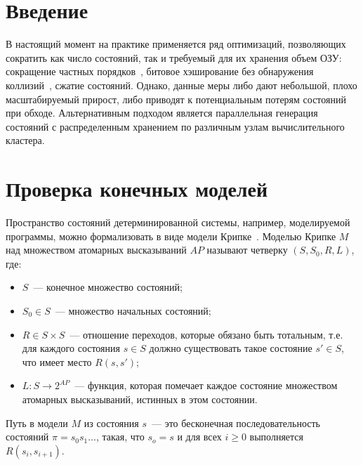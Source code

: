 \documentclass[12pt,a4paper,fleqn]{article}
\begin{document}

\section{Введение}




В настоящий момент на практике применяется ряд оптимизаций, позволяющих сократить как число состояний, так и требуемый для их хранения объем ОЗУ: сокращение частных порядков~\cite{POD}, битовое хэширование без обнаружения коллизий~\cite{BitHash1}, сжатие состояний.
Однако, данные меры либо дают небольшой, плохо масштабируемый прирост, либо приводят к потенциальным потерям
состояний при обходе.
Альтернативным подходом является параллельная генерация состояний с распределенным
хранением по различным узлам вычислительного кластера.


\section{Проверка конечных моделей}
\label{sec:modelchecking}

Пространство состояний детерминированной системы, например, моделируемой программы, можно формализовать в виде модели Крипке~\cite{Clarke}.
Моделью Крипке $M$ над множеством атомарных высказываний $AP$
называют четверку $(S, S_0, R, L)$, где:

\begin{itemize}
\item $S$~--- конечное множество состояний;
\item $S_0 \in S$~--- множество начальных состояний;
\item $R \in S \times S$~--- отношение переходов, которые обязано быть тотальным, т.е. для каждого состояния $s \in S$
  должно существовать такое состояние $s' \in S$, что имеет место $R(s, s')$;
\item $L\colon S \rightarrow 2^{AP}$~--- функция, которая помечает каждое состояние множеством  атомарных высказываний, истинных в этом состоянии.
\end{itemize}

Путь в модели $M$ из состояния $s$~--- это бесконечная последовательность состояний $\pi = s_0 s_1 \ldots$, такая, что
$s_o = s$ и для всех $i \geq 0$ выполняется $R(s_i, s_{i+1})$.
\end{document}
